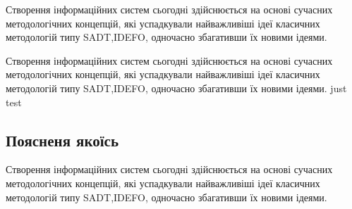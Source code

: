 \documentclass{lib/styles/default-style}
\begin{document}
\pagestyle{default-numbered}

\tableofcontents

\newpage


Створення  інформаційних  систем  сьогодні  здійснюється 
на  основі сучасних  методологічних  концепцій,
які  успадкували  найважливіші  ідеї класичних методологій типу
SADT,IDEFO, одночасно збагативши їх новими ідеями.

Створення  інформаційних  систем  сьогодні  здійснюється  
на  основі сучасних  методологічних  концепцій,
які  успадкували  найважливіші  ідеї класичних методологій типу
SADT,IDEFO, одночасно збагативши їх новими ідеями.
just test
\subsection{Поясненя якоїсь}

Створення  інформаційних  систем  сьогодні  здійснюється  
на  основі сучасних  методологічних  концепцій,
які  успадкували  найважливіші  ідеї класичних методологій типу
SADT,IDEFO, одночасно збагативши їх новими ідеями.
\end{document}
